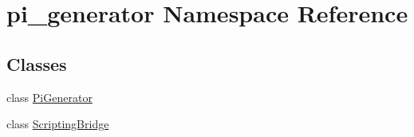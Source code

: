 \hypertarget{namespacepi__generator}{
\section{pi\_\-generator Namespace Reference}
\label{namespacepi__generator}
}
\subsection*{Classes}
\begin{DoxyCompactItemize}
\item 
class \hyperlink{classpi__generator_1_1_pi_generator}{PiGenerator}
\item 
class \hyperlink{classpi__generator_1_1_scripting_bridge}{ScriptingBridge}
\end{DoxyCompactItemize}
